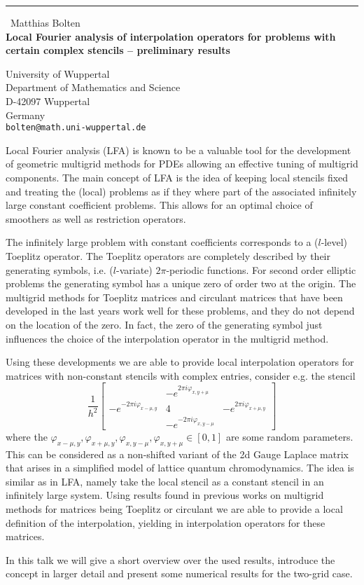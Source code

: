 \documentclass{report}
\begin{document}
\begin{center}
\rule{6in}{1pt} \
{\large Matthias Bolten \\
{\bf Local Fourier analysis of interpolation operators for problems with certain complex stencils -- preliminary results}}

University of Wuppertal \\ Department of Mathematics and Science \\ D-42097 Wuppertal \\ Germany
\\
{\tt bolten@math.uni-wuppertal.de}\end{center}

Local Fourier analysis (LFA) is known to be a valuable tool for the
development of geometric multigrid methods for PDEs allowing an effective
tuning of multigrid components. The main concept of LFA is the idea of
keeping local stencils fixed and treating the (local) problems as if they
where part of the associated infinitely large constant coefficient
problems. This allows for an optimal choice of smoothers as well as
restriction operators.

The infinitely large problem with constant coefficients corresponds to a
($l$-level) Toeplitz operator. The Toeplitz operators are completely
described by their generating symbols, i.e. ($l$-variate) $2
\pi$-periodic functions. For second order elliptic problems the
generating symbol has a unique zero of order two at the origin. The
multigrid methods for Toeplitz matrices and circulant matrices that have
been developed in the last years work well for these problems, and they
do not depend on the location of the zero. In fact, the zero of the
generating symbol just influences the choice of the interpolation
operator in the multigrid method.

Using these developments we are able to provide local interpolation
operators for matrices with non-constant stencils with complex entries,
consider e.g. the stencil
\begin{equation*}
\frac{1}{h^{2}} \left[ \begin{array}{ccc}
& -e^{2 \pi i \varphi_{x,y+\mu}} & \\
-e^{-2 \pi i \varphi_{x-\mu,y}} & 4 & -e^{2 \pi i \varphi_{x+\mu,y}} \\
& -e^{-2 \pi i \varphi_{x,y-\mu}} &
\end{array} \right]
\end{equation*}
where the $\varphi_{x-\mu,y}, \varphi_{x+\mu,y}, \varphi_{x,y-\mu},
\varphi_{x,y+\mu} \in [0,1]$ are some random parameters. This can be
considered as a non-shifted variant of the 2d Gauge Laplace matrix that
arises in a simplified model of lattice quantum chromodynamics. The idea
is similar as in LFA, namely take the local stencil as a constant stencil
in an infinitely large system. Using results found in previous works on
multigrid methods for matrices being Toeplitz or circulant we are able to
provide a local definition of the interpolation, yielding in
interpolation operators for these matrices.

In this talk we will give a short overview over the used results,
introduce the concept in larger detail and present some numerical results
for the two-grid case.
\end{document}
